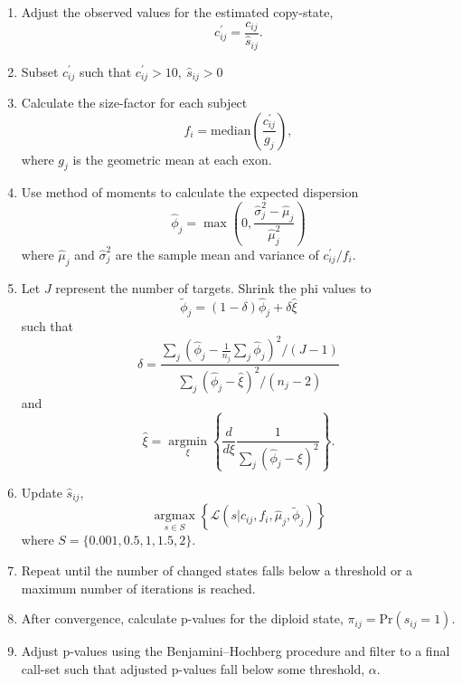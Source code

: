 \documentclass{article}\usepackage[]{graphicx}\usepackage[]{color}
\begin{document}
\begin{enumerate}
  \item Adjust the observed values for the estimated copy-state,
  \begin{equation}
  c_{ij}^{\prime} = \frac{c_{ij}}{\hat{s}_{ij}}.
  \end{equation}
  \item Subset $c_{ij}^{\prime}$ such that $c_{ij}^{\prime} > 10, ~ \hat{s}_{ij} > 0$
  \item Calculate the size-factor for each subject
  \begin{equation}
  f_i = \text{median}\left(\frac{c_{ij}^{\prime}}{g_j}\right),
  \end{equation}
  where $g_j$ is the geometric mean at each exon.
  \item Use method of moments to calculate the expected dispersion
  \begin{equation}
  \hat\phi_j = \max\left(0, \frac{\hat\sigma_j^2 - \hat{\mu}_j}{\hat{\mu}_j^2}\right)
  \end{equation}
  where $\hat{\mu}_j$ and $\hat{\sigma}_j^2$ are the sample mean and variance of $c_{ij}^{\prime}/f_i$.
  \item Let $J$ represent the number of targets. Shrink the phi values to
  \begin{equation}
  \tilde\phi_j = (1 - \delta)\hat\phi_j + \delta\hat{\xi}
  \end{equation}
  such that
  \begin{equation}
  \delta = \frac{\sum\limits_j\left(\hat\phi_j - \frac{1}{n_j}\sum\limits_j \hat\phi_j\right)^2/(J - 1)}
  {\sum\limits_j\left(\hat\phi_j - \hat{\xi}\right)^2/(n_j - 2)}
  \end{equation}
  and
  \begin{equation}
  \hat{\xi} = \mathop{\text{argmin}}\limits_{\xi}\left\{
  \frac{d}{d\xi}\frac{1}{\sum\limits_j \left(\hat\phi_j - \xi\right)^2}
  \right\}.
  \end{equation}
  \item Update $\hat{s}_{ij}$,
  \begin{equation}
  \mathop{\text{argmax}}\limits_{s \in S}\left\{
  \mathcal{L}(s \rvert c_{ij},f_i,\hat\mu_j,\tilde\phi_j)
  \right\}
  \end{equation}
  where $S = \{0.001, 0.5, 1, 1.5, 2\}$.
  \item Repeat until the number of changed states falls below a threshold or a maximum number of iterations is reached.
  \item After convergence, calculate p-values for the diploid state, $\pi_{ij} = \text{Pr}(s_{ij} = 1)$.
  \item Adjust p-values using the Benjamini–Hochberg procedure \cite{benjamini:1995aa} and filter to a final call-set such that adjusted p-values fall below some threshold, $\alpha$.
\end{enumerate}
\end{document}
